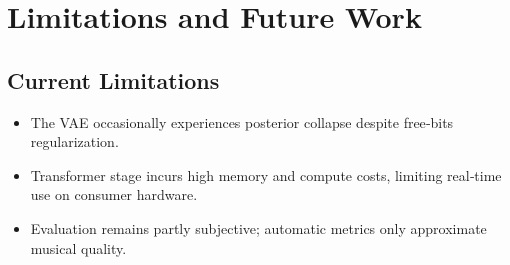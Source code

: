 \section{Limitations and Future Work}

\subsection{Current Limitations}
\begin{itemize}
  \item The VAE occasionally experiences posterior collapse despite free‐bits regularization.
  \item Transformer stage incurs high memory and compute costs, limiting real‐time use on consumer hardware.
  \item Evaluation remains partly subjective; automatic metrics only approximate musical quality.
\end{itemize}